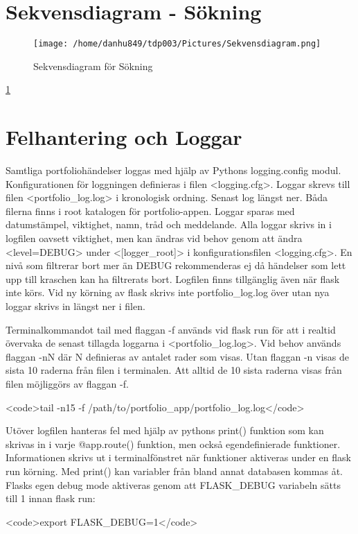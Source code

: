\documentclass{TDP003mall}
\begin{document}
\section{Sekvensdiagram - Sökning}

\begin{figure}[h!]
  \centerline{\texttt{[image: /home/danhu849/tdp003/Pictures/Sekvensdiagram.png]}}
  \caption{Sekvensdiagram för Sökning\label{fig1}}
\end{figure}

\ref{fig1}

\section{Felhantering och Loggar}
Samtliga portfoliohändelser loggas med hjälp av Pythons logging.config modul. Konfigurationen för loggningen definieras i filen <logging.cfg>. Loggar skrevs till filen <portfolio\_log.log> i kronologisk ordning. Senast log längst ner. Båda filerna finns i root katalogen för portfolio-appen. Loggar sparas med datumstämpel, viktighet, namn, tråd och meddelande. Alla loggar skrivs in i logfilen oavsett viktighet, men kan ändras vid behov genom att ändra <level=DEBUG> under <[logger\_root]> i konfigurationsfilen <logging.cfg>. En nivå som filtrerar bort mer än DEBUG rekommenderas ej då händelser som lett upp till kraschen kan ha filtrerats bort. Logfilen finns tillgänglig även när flask inte körs. Vid ny körning av flask skrivs inte portfolio\_log.log över utan nya loggar skrivs in längst ner i filen.

Terminalkommandot tail med flaggan -f används vid flask run för att i realtid övervaka de senast tillagda loggarna i <portfolio\_log.log>. Vid behov används flaggan -nN där N definieras av antalet rader som visas. Utan flaggan -n visas de sista 10 raderna från filen i terminalen. Att alltid de 10 sista raderna visas från filen möjliggörs av flaggan -f.

<code>tail -n15 -f /path/to/portfolio\_app/portfolio\_log.log</code>

Utöver logfilen hanteras fel med hjälp av pythons print() funktion som kan skrivas in i varje @app.route() funktion, men också egendefinierade funktioner. Informationen skrivs ut i terminalfönstret när funktioner aktiveras under en flask run körning. Med print() kan variabler från bland annat databasen kommas åt. Flasks egen debug mode aktiveras genom att FLASK\_DEBUG variabeln sätts till 1 innan flask run:

<code>export FLASK\_DEBUG=1</code>
\end{document}
